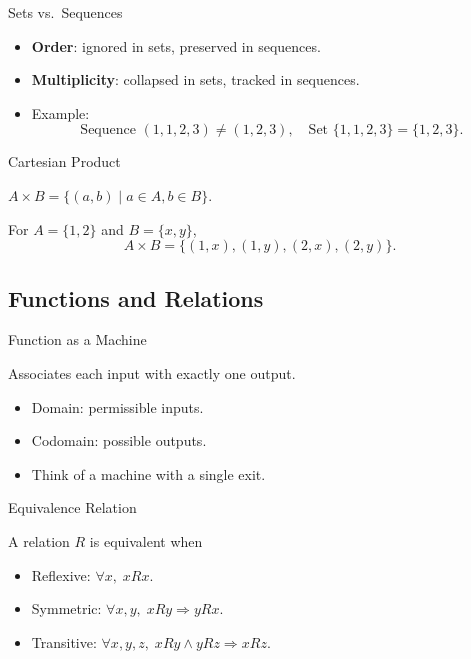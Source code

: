 \documentclass[aspectratio=169]{beamer}
\begin{document}
\begin{frame}{Sets vs.\ Sequences}
  \begin{itemize}
    \item \textbf{Order}: ignored in sets, preserved in sequences.
    \item \textbf{Multiplicity}: collapsed in sets, tracked in sequences.
    \item Example:
      \[
        \text{Sequence } (1,1,2,3) \neq (1,2,3), \quad
        \text{Set } \{1,1,2,3\} = \{1,2,3\}.
      \]
  \end{itemize}
\end{frame}

\begin{frame}{Cartesian Product}
  \begin{definition}
    $A \times B = \{(a,b) \mid a \in A, b \in B\}$.
  \end{definition}
  \begin{example}
    For $A=\{1,2\}$ and $B=\{x,y\}$,
    \[
      A \times B = \{(1,x),(1,y),(2,x),(2,y)\}.
    \]
  \end{example}
\end{frame}

\subsection{Functions and Relations}

\begin{frame}{Function as a Machine}
  \begin{definition}[Function]
    Associates each input with exactly one output.
  \end{definition}
  \begin{itemize}
    \item Domain: permissible inputs.
    \item Codomain: possible outputs.
    \item Think of a machine with a single exit.
  \end{itemize}
\end{frame}

\begin{frame}{Equivalence Relation}
  \begin{definition}
    A relation $R$ is equivalent when
    \begin{itemize}
      \item Reflexive: $\forall x,\; xRx$.
      \item Symmetric: $\forall x,y,\; xRy \Rightarrow yRx$.
      \item Transitive: $\forall x,y,z,\; xRy \land yRz \Rightarrow xRz$.
    \end{itemize}
  \end{definition}
\end{frame}
\end{document}

